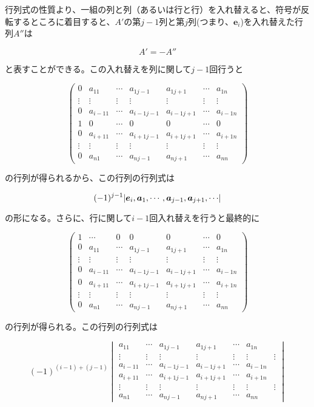 \documentclass[dvipdfmx,autodetect-engine]{jsarticle}
\theoremstyle{definition}
\DeclarePairedDelimiter{\abs}{\lvert}{\rvert}
\begin{document}
行列式の性質より、一組の列と列（あるいは行と行）を入れ替えると、符号が反転するところに着目すると、$A'$の第$j-1$列と第$j$列(つまり、$\bm{e}_i$)を入れ替えた行列$A''$は

$$
A' = -A''
$$

と表すことができる。この入れ替えを列に関して$j-1$回行うと

$$
\begin{pmatrix*}
0 & a_{11} & \cdots & a_{1{j-1}} & a_{1{j+1}} & \cdots & a_{1n} \\
\vdots & \vdots & \vdots & \vdots & \vdots & \vdots & \vdots \\
0 & a_{{i-1}1} & \cdots & a_{{i-1}{j-1}} & a_{{i-1}{j+1}} & \cdots & a_{{i-1}n} \\
1 & 0 & \cdots & 0 & 0 & \cdots & 0 \\
0 & a_{{i+1}1} & \cdots & a_{{i+1}{j-1}} & a_{{i+1}{j+1}} & \cdots & a_{{i+1}n} \\
\vdots & \vdots & \vdots & \vdots & \vdots & \vdots & \vdots \\
0 & a_{n1} & \cdots & a_{n{j-1}} & a_{n{j+1}} & \cdots & a_{nn}
\end{pmatrix*}
$$

の行列が得られるから、この行列の行列式は

$$
(-1)^{j-1}\abs{\bm{e}_i, \bm{a}_1, \cdots, \bm{a}_{j-1}, \bm{a}_{j+1}, \cdots}
$$

の形になる。さらに、行に関して$i-1$回入れ替えを行うと最終的に

$$
\begin{pmatrix*}
1 & \cdots & 0 & 0 & 0 & \cdots & 0 \\
0 & a_{11} & \cdots & a_{1{j-1}} & a_{1{j+1}} & \cdots & a_{1n} \\
\vdots & \vdots & \vdots & \vdots & \vdots & \vdots & \vdots \\
0 & a_{{i-1}1} & \cdots & a_{{i-1}{j-1}} & a_{{i-1}{j+1}} & \cdots & a_{{i-1}n} \\
0 & a_{{i+1}1} & \cdots & a_{{i+1}{j-1}} &a_{{i+1}{j+1}} & \cdots & a_{{i+1}n} \\
\vdots & \vdots & \vdots & \vdots &\vdots & \vdots & \vdots \\
0 & a_{n1} & \cdots & a_{n{j-1}} &a_{n{j+1}} & \cdots & a_{nn}
\end{pmatrix*}
$$

の行列が得られる。この行列の行列式は

$$
(-1)^{(i-1)+(j-1)}\begin{vmatrix}
a_{11} & \cdots & a_{1{j-1}} & a_{1{j+1}} & \cdots & a_{1n} \\
\vdots & \vdots & \vdots & \vdots & \vdots & \vdots & \vdots \\
a_{{i-1}1} & \cdots & a_{{i-1}{j-1}} & a_{{i-1}{j+1}} & \cdots & a_{{i-1}n} \\
a_{{i+1}1} & \cdots & a_{{i+1}{j-1}} &a_{{i+1}{j+1}} & \cdots & a_{{i+1}n} \\
\vdots & \vdots & \vdots & \vdots &\vdots & \vdots & \vdots \\
a_{n1} & \cdots & a_{n{j-1}} &a_{n{j+1}} & \cdots & a_{nn}
\end{vmatrix}
$$
\end{document}
